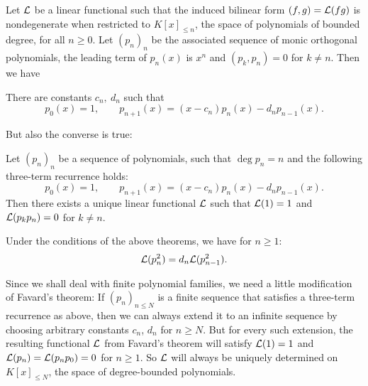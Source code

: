 Let $\mathcal{L}$ be a linear functional such that the induced bilinear form $(f,g)=\mathcal{L}(fg)$ is nondegenerate when restricted to $K[x]_{\leq n}$, the space of polynomials of bounded degree, for all $n\geq 0$. Let $(p_n)_n$ be the associated sequence of monic orthogonal polynomials, \ie the leading term of $p_n(x)$ is $x^n$ and $(p_k,p_{n})=0$ for $k\neq n$. Then we have
\begin{theorem} \cite[Thm.~4.1]{Chihara} There are constants $c_n,\: d_n$ such that
\begin{equation*}
 p_0(x) = 1,\qquad  p_{n+1}(x) = (x-c_n)p_n(x) - d_np_{n-1}(x).
\end{equation*}
\end{theorem}
But also the converse is true:
\begin{theorem} \cite[Thm.~4.4]{Chihara} \label{favard}
Let $(p_n)_n$ be a sequence of polynomials, such that $\deg p_n =n$ and the following three-term recurrence holds:
$$p_0(x) = 1,\qquad  p_{n+1}(x) = (x-c_n)p_n(x) - d_np_{n-1}(x).
$$
Then there exists a unique linear functional $\mathcal{L}$ such that $\mathcal{L}(1)=1$ and $\mathcal{L}(p_kp_{n})=0$ for $k\neq n$. 
\end{theorem}
\begin{theorem}\cite[Thm.~4.2]{Chihara} \label{generalLnorm}
Under the conditions of the above theorems, we have for $n\geq 1$: $$\mathcal{L}(p_n^2) = d_n\mathcal{L}(p_{n-1}^2).$$
\end{theorem}
\begin{remark} \label{finiteFarvard}Since we shall deal with finite polynomial families, we need a little modification of Favard's theorem:
If $(p_n)_{n\leq N}$ is a finite sequence that satisfies a three-term recurrence as above, then we can always extend it to an infinite sequence by choosing arbitrary constants $c_n$, $d_n$ for $n\geq N$. But for every such extension, the resulting functional $\mathcal{L}$ from Favard's theorem will satisfy $\mathcal{L}(1) =1$ and $\mathcal{L}(p_n)=\mathcal{L}(p_np_0)=0$ for $n\geq 1$. So $\mathcal{L}$ will always be uniquely determined on $K[x]_{\leq N}$, the space of degree-bounded polynomials.
\end{remark}







